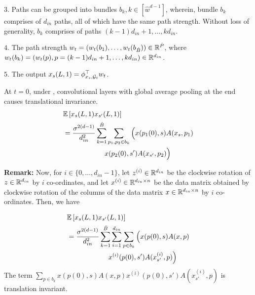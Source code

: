 $3.$ Paths can be grouped into bundles $b_k,k\in[\hat{w}^{d-1}]$, wherein, bundle $b_k$ comprises of $d_{in}$ paths, all of which have the same path strength. Without loss of generality, $b_k$ comprises of paths $(k-1)d_{in}+1,\ldots, kd_{in}$.

$4.$ The path strength $w_t=(w_t(b_1),\ldots, w_t(b_{\hat{B}}))\in \mathbb{R}^{\hat{P}}$, where $w_t(b_k)=(w_t(p),p=(k-1)d_{in}+1,\ldots,kd_{in})\in \mathbb{R}^{d_{in}}$. 

$5.$ The output $x_s(L,1)=\phi^\top_{x_s,\mathcal{G}_t} w_t$.

\begin{lemma}\label{lm:invariance}
At $t=0$, under , convolutional layers with global average pooling at the end causes translational invariance.
\begin{align*}
&\mathbb{E}\left[x_s(L,1)x_{s'}(L,1)\right]\\&=\frac{\sigma^{2(d-1)}}{d^2_{in}}\sum_{k=1}^{\hat{B}} \sum_{p_1,p_2\in b_k}  \Big( x(p_1(0),s) A(x_s,p_1)\\
&\quad\quad \quad\quad \quad\quad x(p_2(0),s') A(x_{s'},p_2) \Big)
\end{align*}
\end{lemma}

\textbf{Remark:} Now, for $i\in\{0,\ldots, d_{in}-1\}$, let $z^{(i)}\in \mathbb{R}^{d_{in}}$ be the clockwise rotation of $z\in \mathbb{R}^{d_{in}}$ by $i$ co-ordinates, and let $x^{(i)}\in \mathbb{R}^{d_{in}\times n}$ be the data matrix obtained by clockwise rotation of the columns of the data matrix $x\in \mathbb{R}^{d_{in}\times n}$ by $i$ co-ordinates. Then, we have

\begin{align*}
&\mathbb{E}\left[x_s(L,1)x_{s'}(L,1)\right]\\
&=\frac{\sigma^{2(d-1)}}{d^2_{in}}\sum_{k=1}^{\hat{B}} \sum_{i=1}^{d_{in}} \sum_{p\in b_k}   \Big(x(p(0),s) A(x,p) \\ 
&\quad\quad \quad\quad \quad\quad x^{(i)}(p(0),s') A(x^{(i)}_{s'},p) \Big)
\end{align*}
The term $\sum_{p\in b_k}  x(p(0),s) A(x,p) x^{(i)}(p(0),s') A(x^{(i)}_{s'},p)$ is translation invariant.



